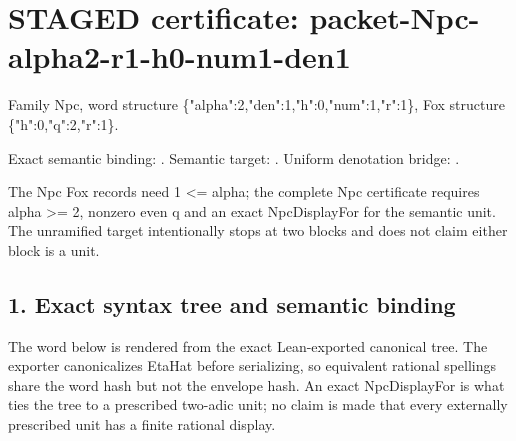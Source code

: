 \section*{STAGED certificate: packet-Npc-alpha2-r1-h0-num1-den1}
Family Npc, word structure \{"alpha":2,"den":1,"h":0,"num":1,"r":1\}, Fox structure \{"h":0,"q":2,"r":1\}.

\noindent Exact semantic binding: . Semantic target: . Uniform denotation bridge: .
\par\noindent The Npc Fox records need 1 <= alpha; the complete Npc certificate requires alpha >= 2, nonzero even q and an exact NpcDisplayFor for the semantic unit. The unramified target intentionally stops at two blocks and does not claim either block is a unit.

\subsection*{1. Exact syntax tree and semantic binding}
The word below is rendered from the exact Lean-exported canonical tree. The exporter canonicalizes EtaHat before serializing, so equivalent rational spellings share the word hash but not the envelope hash. An exact NpcDisplayFor is what ties the tree to a prescribed two-adic unit; no claim is made that every externally prescribed unit has a finite rational display.

